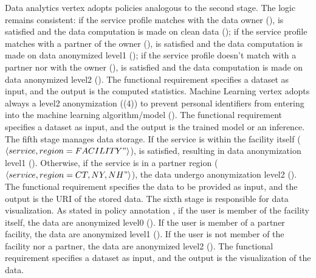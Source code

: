 Data analytics vertex adopts policies analogous to the second stage. The logic remains consistent:
if the service profile matches with the data owner (\pone),  is satisfied and the data computation is made on clean data ();
if the service profile matches with a partner of the owner (\ptwo),  is satisfied and the data computation is made on data anonymized level1 ();
if the service profile doesn't match with a partner nor with the owner (\pthree),  is satisfied and the data computation is made on data anonymized level2  ().
The functional requirement specifies a dataset as input, and the output is the computed statistics.
Machine Learning vertex adopts always a level2 anonymization (\p(4)) to prevent personal identifiers from entering into the machine learning algorithm/model ().
The functional requirement specifies a dataset as input, and the output is the trained model or an inference.
The fifth stage manages data storage.
If the service is within the facility itself ($\langle service,region=FACILITY"\rangle$),  is satisfied, resulting in data anonymization level1 ().
Otherwise, if the service is in a partner region ($\langle service,region={CT,NY,NH}"\rangle$), the data undergo anonymization level2 ().
The functional requirement specifies the data to be provided as input, and the output is the URI of the stored data.
The sixth stage is responsible for data visualization.
As stated in policy annotation , if the user is member of the facility itself, the data are anonymized level0 ().
If the user is member of a partner facility, the data are anonymized level1 ().
If the user is not member of the facility nor a partner, the data are anonymized level2 ().
The functional requirement specifies a dataset as input, and the output is the visualization of the data.





